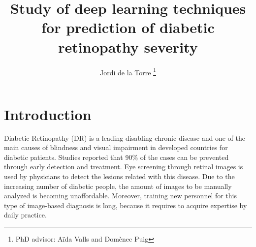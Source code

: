 \documentclass{dcsm}
\begin{document}

\title*{
Study of deep learning techniques for prediction of diabetic retinopathy severity
}
\author{
 Jordi de la Torre \thanks{PhD advisor: A\"ida Valls and Dom\`enec Puig}
}



\maketitle



\section{Introduction}

Diabetic Retinopathy (DR) is a leading disabling chronic disease  and  one of the main causes of blindness and visual impairment in developed countries for diabetic patients. Studies reported that 90\% of the cases can be prevented through early detection and treatment. Eye screening through retinal images is used by physicians to detect the lesions related with this disease. Due to the increasing number of diabetic people, the amount of images to be manually analyzed is becoming unaffordable. Moreover, training new personnel for this type of image-based diagnosis is long, because it requires to acquire expertise by daily practice. 
\end{document}
